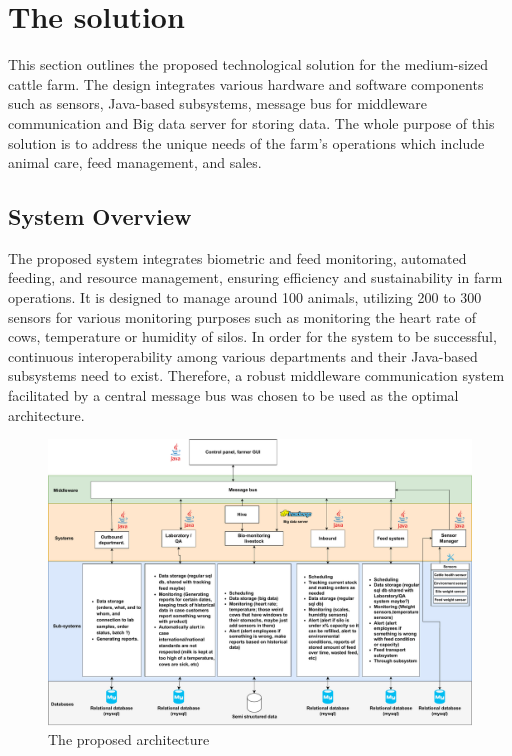 \section{The solution}
\label{sec:middleware_architecture}

This section outlines the proposed technological solution for the medium-sized cattle farm. The design integrates various hardware and software components such as sensors, Java-based subsystems, message bus for middleware communication and Big data server for storing data. The whole purpose of this solution is to address the unique needs of the farm's operations which include animal care, feed management, and sales.

\subsection{\textbf{System Overview}}
The proposed system integrates biometric and feed monitoring, automated feeding, and resource management, ensuring efficiency and sustainability in farm operations. It is designed to manage around 100 animals, utilizing 200 to 300 sensors for various monitoring purposes such as monitoring the heart rate of cows, temperature or humidity of silos. In order for the system to be successful, continuous interoperability among various departments and their Java-based subsystems need to exist. Therefore, a robust middleware communication system facilitated by a central message bus was chosen to be used as the optimal architecture. \newline
\begin{figure}[!ht]
    \centering
    \includegraphics[width=\textwidth]{Images/architecture.pdf}
    \caption{The proposed architecture}
    \label{fig:systemArch}
\end{figure}

